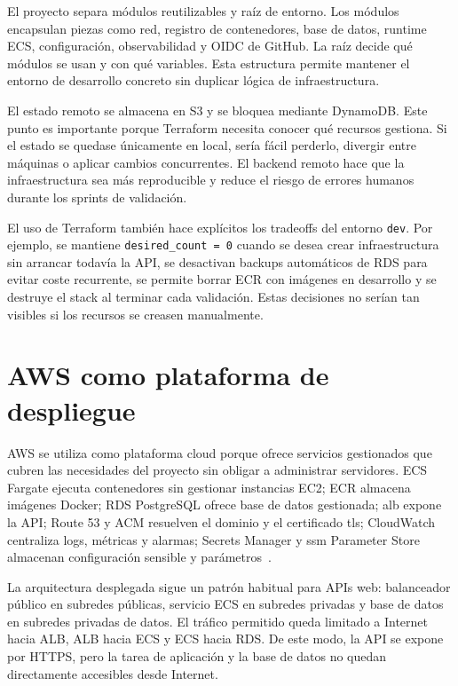 El proyecto separa módulos reutilizables y raíz de entorno. Los módulos encapsulan piezas como red, registro de contenedores, base de datos, runtime ECS, configuración, observabilidad y OIDC de GitHub. La raíz  decide qué módulos se usan y con qué variables. Esta estructura permite mantener el entorno de desarrollo concreto sin duplicar lógica de infraestructura.

El estado remoto se almacena en S3 y se bloquea mediante DynamoDB. Este punto es importante porque Terraform necesita conocer qué recursos gestiona. Si el estado se quedase únicamente en local, sería fácil perderlo, divergir entre máquinas o aplicar cambios concurrentes. El backend remoto hace que la infraestructura sea más reproducible y reduce el riesgo de errores humanos durante los sprints de validación.

El uso de Terraform también hace explícitos los tradeoffs del entorno \texttt{dev}. Por ejemplo, se mantiene \texttt{desired\_count = 0} cuando se desea crear infraestructura sin arrancar todavía la API, se desactivan backups automáticos de RDS para evitar coste recurrente, se permite borrar ECR con imágenes en desarrollo y se destruye el stack al terminar cada validación. Estas decisiones no serían tan visibles si los recursos se creasen manualmente.

\section{AWS como plataforma de despliegue}
\label{sec:marco-aws}

AWS se utiliza como plataforma cloud porque ofrece servicios gestionados que cubren las necesidades del proyecto sin obligar a administrar servidores. ECS Fargate ejecuta contenedores sin gestionar instancias EC2; ECR almacena imágenes Docker; RDS PostgreSQL ofrece base de datos gestionada; \acrshort{alb} expone la API; Route 53 y ACM resuelven el dominio y el certificado \acrshort{tls}; CloudWatch centraliza logs, métricas y alarmas; Secrets Manager y \acrshort{ssm} Parameter Store almacenan configuración sensible y parámetros~\cite{AwsEcsDocs,AwsRdsDocs,AwsAlbDocs,AwsRoute53Docs,AwsAcmDocs,AwsCloudWatchDocs,AwsSecretsManagerDocs,AwsSystemsManagerDocs}.

La arquitectura desplegada sigue un patrón habitual para APIs web: balanceador público en subredes públicas, servicio ECS en subredes privadas y base de datos en subredes privadas de datos. El tráfico permitido queda limitado a Internet hacia ALB, ALB hacia ECS y ECS hacia RDS. De este modo, la API se expone por HTTPS, pero la tarea de aplicación y la base de datos no quedan directamente accesibles desde Internet.

